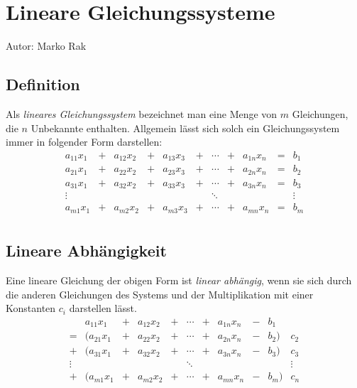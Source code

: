 \chapter{Lineare Gleichungssysteme}
	
	Autor: Marko Rak
	
	\section{Definition}
	
		Als \emph{lineares Gleichungssystem} bezeichnet man eine Menge von $m$ Gleichungen,
		die $n$ Unbekannte enthalten.
		Allgemein l\"asst sich solch ein Gleichungssystem immer in folgender Form darstellen:
		\[
			\begin{array} {ccccccccccc}
				a_{11} x_1 & + & a_{12} x_2 & + & a_{13} x_3 & + & \cdots & + & a_{1n} x_n & = & b_1\\
				a_{21} x_1 & + & a_{22} x_2 & + & a_{23} x_3 & + & \cdots & + & a_{2n} x_n & = & b_2\\
				a_{31} x_1 & + & a_{32} x_2 & + & a_{33} x_3 & + & \cdots & + & a_{3n} x_n & = & b_3\\
				\vdots & & & & & & \ddots & & & & \vdots\\
				a_{m1} x_1 & + & a_{m2} x_2 & + & a_{m3} x_3 & + & \cdots & + & a_{mn} x_n & = & b_m\\
			\end{array}
		\]
		
	\section{Lineare Abh\"angigkeit}
		
		Eine lineare Gleichung der obigen Form ist \emph{linear abh\"angig},
		wenn sie sich durch die anderen Gleichungen des Systems und der Multiplikation mit einer Konstanten $c_i$ darstellen l\"asst.
		\[
			\begin{array} {ccccccccccccc}
				& &a_{11} x_1 & + & a_{12} x_2 & + & \cdots & + & a_{1n} x_n & - & b_1 &  & \\
				 & = & (a_{21} x_1 & + & a_{22} x_2 & + & \cdots & + & a_{2n} x_n & - & b_2) & c_2 \\
				& + & (a_{31} x_1 & + & a_{32} x_2 & + & \cdots & + & a_{3n} x_n & - & b_3) & c_3\\
				 &\vdots &  & & & & \ddots  & & & & & \vdots\\
				& + & (a_{m1} x_1 & + & a_{m2} x_2 & + & \cdots & + & a_{mn} x_n & - & b_m) & c_n \\
			\end{array}
		\]
		
